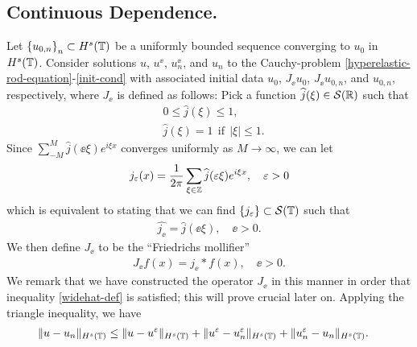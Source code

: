 \subsection{Continuous Dependence.}
Let $\left\{ u_{0, n} \right\}_n \subset H^s(\mathbb{T})$ be a uniformly bounded
sequence converging to $u_0$ in $H^s(\mathbb{T})$.
Consider solutions $u $, $u^\ee$, $u^\ee_n$, and $u_n$ to the Cauchy-problem
\eqref{hyperelastic-rod-equation}-\eqref{init-cond}
with associated initial data $u_0$, $J_\ee u_0$,
$J_\ee u_{0,n}$, and $u_{0,n}$, respectively, where $J_\ee$ is defined as follows: Pick a function $\widehat{j}(\xi) \in \mathcal{S}(\mathbb{R})$ such that
\begin{equation}
\label{0u}
\begin{split}
& 0 \le \widehat{j}(\xi) \le 1,
\\
& \widehat{j}(\xi) = 1 \ \ \text{if} \ \ |\xi| \le 1.
\end{split}
\end{equation}
Since $\sum_{-M}^M \widehat{j}(\ee \xi) e^{i \xi x}$ converges uniformly as $M \to
\infty$, we can let
\begin{equation}
\begin{split}
j_\varepsilon (x) = \frac{1}{2 \pi}\sum_{\xi \in \mathbb{Z}}
\widehat{j}(\varepsilon \xi) e^{i \xi x}, \quad \varepsilon > 0
\label{parseval-def}
\end{split}
\end{equation}
which is equivalent to stating that we can find $\left\{ j_\varepsilon
\right\} \subset \mathcal{S}(\mathbb{T})$ such that
\begin{equation}
\begin{split}
\widehat{j_\ee} = \widehat{j }(\ee \xi), \quad \ee > 0.
\label{widehat-def}
\end{split}
\end{equation}
We then define $J_\ee$ to be the ``Friedrichs mollifier''
\begin{equation}
\label{0'u}
\begin{split}
J_\ee f(x) = j_\ee * f(x), \quad \ee>0.
\end{split}
\end{equation}
We remark that we have constructed the operator $J_\ee$ in this manner in
order that inequality \eqref{widehat-def} is satisfied; this will prove
crucial later on.
%
Applying
the triangle inequality, we have
\begin{equation*}
\begin{split}
\|u - u_n\|_{H^s(\mathbb{T})}
& \le \|u - u^\varepsilon\|_{H^s(\mathbb{T})}
+ \|u^\varepsilon - u^{\varepsilon}_n \|_{H^s(\mathbb{T}) }
+  \|u^{\varepsilon}_n - u_n \|_{H^s(\mathbb{T})}.
\end{split}
\end{equation*}
